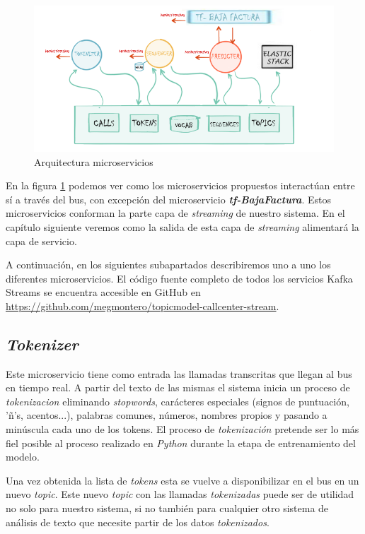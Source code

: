 \begin{figure}[!ht]
	\centering
	\includegraphics[width=1\textwidth]{images/exp/micro-arch-v3}
	\caption{Arquitectura microservicios}
	\label{fig:micro-arch}
\end{figure}


En la figura \ref{fig:micro-arch} podemos ver como los microservicios propuestos interactúan entre sí a través del bus, con excepción del microservicio  \textbf{\textit{tf-BajaFactura}}. Estos microservicios conforman la parte capa de \textit{streaming} de nuestro sistema. En el capítulo siguiente veremos como la salida de esta capa de \textit{streaming} alimentará la capa de servicio.


A continuación, en los siguientes subapartados describiremos uno a uno los diferentes microservicios. El código fuente completo de todos los servicios Kafka Streams se encuentra accesible en GitHub en \href{https://github.com/megmontero/topicmodel-callcenter-stream}{https://github.com/megmontero/topicmodel-callcenter-stream}. 


\subsection{\textit{Tokenizer}}

Este microservicio tiene como entrada las llamadas transcritas que llegan al bus en tiempo real. A partir del texto de las mismas el sistema inicia un proceso de \textit{tokenizacion} eliminando \textit{stopwords}, carácteres especiales (signos de puntuación, 'ñ's, acentos...), palabras comunes, números, nombres propios y pasando a minúscula cada uno de los tokens.  El proceso de \textit{tokenización} pretende ser lo más fiel posible al proceso realizado en \textit{Python} durante la etapa de entrenamiento del modelo.

Una vez obtenida la lista de \textit{tokens} esta se vuelve a disponibilizar en el bus en un nuevo \textit{topic}. Este nuevo \textit{topic} con las llamadas \textit{tokenizadas} puede ser de utilidad no solo para nuestro sistema, si no también para cualquier otro sistema de análisis de texto que necesite partir de los datos \textit{tokenizados}.

